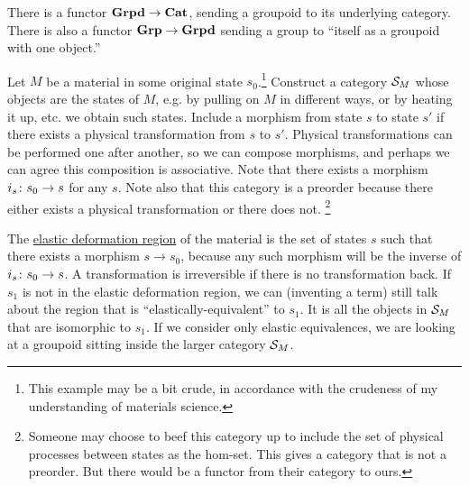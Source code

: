 \documentclass[CT4S-EN-RU]{subfiles}
\begin{document}
\begin{definitionRUS}
\end{definitionRUS}

\begin{exampleENG}
There is a functor ${\mathbf{Grpd}}\rightarrow{\mathbf{Cat}}$, sending a groupoid to its underlying category. There is also a functor ${\mathbf{Grp}}\rightarrow{\mathbf{Grpd}}$ sending a group to “itself as a groupoid with one object.” 
\end{exampleENG}

\begin{exampleRUS}
\end{exampleRUS}

\begin{applicationENG}
Let $M$ be a material in some original state $s_0$.\footnote{This example may be a bit crude, in accordance with the crudeness of my understanding of materials science.} Construct a category $\mathcal{S}_M$ whose objects are the states of $M$, e.g. by pulling on $M$ in different ways, or by heating it up, etc. we obtain such states. Include a morphism from state $s$ to state $s'$ if there exists a physical transformation from $s$ to $s'$. Physical transformations can be performed one after another, so we can compose morphisms, and perhaps we can agree this composition is associative. Note that there exists a morphism $i_s\colon s_0\rightarrow s$ for any $s$. Note also that this category is a preorder because there either exists a physical transformation or there does not. 
\footnote{Someone may choose to beef this category up to include the set of physical processes between states as the hom-set. This gives a category that is not a preorder. But there would be a functor from their category to ours.}

The \href{http://en.wikipedia.org/wiki/Elastic_modulus}{\text elastic deformation region} of the material is the set of states $s$ such that there exists a morphism $s\to s_0$, because any such morphism will be the inverse of $i_s\colon s_0\rightarrow s$. A transformation is irreversible if there is no transformation back. If $s_1$ is not in the elastic deformation region, we can (inventing a term) still talk about the region that is “elastically-equivalent” to $s_1$. It is all the objects in $\mathcal{S}_M$ that are isomorphic to $s_1$. If we consider only elastic equivalences, we are looking at a groupoid sitting inside the larger category $\mathcal{S}_M$.
\end{applicationENG}
\end{document}

